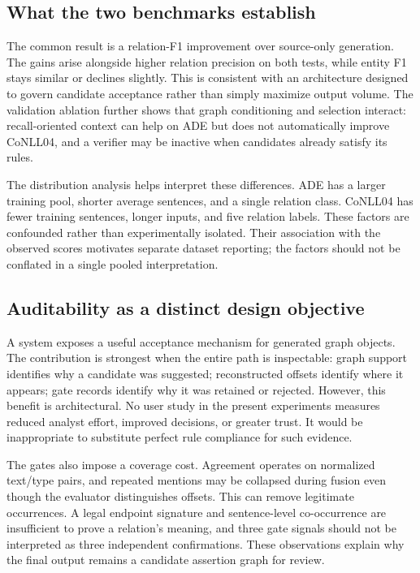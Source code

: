 \documentclass[preprint,12pt]{elsarticle}
\begin{document}
\subsection{What the two benchmarks establish}
The common result is a relation-F1 improvement over source-only generation. The gains arise
alongside higher relation precision on both tests, while entity F1 stays
similar or declines slightly. This is consistent with an architecture designed
to govern candidate acceptance rather than simply maximize output volume.
The validation ablation further shows that graph conditioning and selection
interact: recall-oriented context can help on ADE but does not automatically
improve CoNLL04, and a verifier may be inactive when candidates already satisfy
its rules.

The distribution analysis helps interpret these differences. ADE has a larger
training pool, shorter average sentences, and a single relation class.
CoNLL04 has fewer training sentences, longer inputs, and five relation labels.
These factors are confounded rather than experimentally isolated. Their
association with the observed scores motivates separate dataset reporting;
the factors should not be conflated in a single pooled interpretation.

\subsection{Auditability as a distinct design objective}
A system exposes a useful acceptance mechanism for generated graph objects.
The contribution is strongest when the entire path is inspectable: graph support identifies why a candidate
was suggested; reconstructed offsets identify where it appears; gate records
identify why it was retained or rejected. However, this benefit is architectural.
No user study in the present experiments measures reduced analyst effort,
improved decisions, or greater trust. It would be inappropriate to substitute
perfect rule compliance for such evidence.

The gates also impose a coverage cost. Agreement operates on normalized
text/type pairs, and repeated mentions may be collapsed during fusion even
though the evaluator distinguishes offsets. This can remove legitimate
occurrences. A legal endpoint signature and sentence-level co-occurrence are
insufficient to prove a relation's meaning, and three gate signals should not
be interpreted as three independent confirmations. These observations explain
why the final output remains a candidate assertion graph for review.
\end{document}
